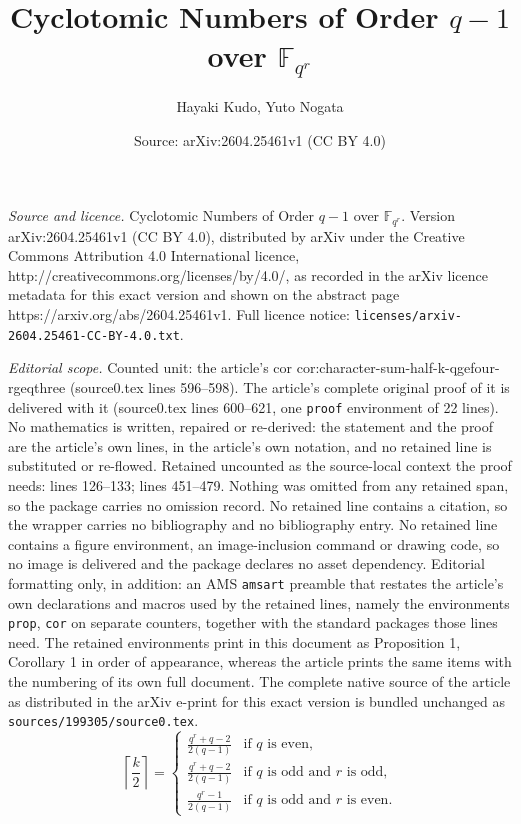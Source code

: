 \documentclass[10pt,a4paper]{amsart}
\title{Cyclotomic Numbers of Order $q-1$ over $\mathbb{F}_{q^r}$}
\author{Hayaki Kudo, Yuto Nogata}
\date{Source: arXiv:2604.25461v1 (CC BY 4.0)}
\begin{document}
\maketitle

\noindent\emph{Source and licence.} Cyclotomic Numbers of Order $q-1$ over $\mathbb{F}_{q^r}$. Version arXiv:2604.25461v1 (CC BY 4.0), distributed by arXiv under the Creative Commons Attribution 4.0 International licence, http://creativecommons.org/licenses/by/4.0/, as recorded in the arXiv licence metadata for this exact version and shown on the abstract page https://arxiv.org/abs/2604.25461v1. Full licence notice: \texttt{licenses/arxiv-2604.25461-CC-BY-4.0.txt}.\par\smallskip

\noindent\textit{Editorial scope.} Counted unit: the article's cor cor:character-sum-half-k-qgefour-rgeqthree (source0.tex lines 596--598). The article's complete original proof of it is delivered with it (source0.tex lines 600--621, one \texttt{proof} environment of 22 lines). No mathematics is written, repaired or re-derived: the statement and the proof are the article's own lines, in the article's own notation, and no retained line is substituted or re-flowed.  Retained uncounted as the source-local context the proof needs: lines 126--133; lines 451--479.  Nothing was omitted from any retained span, so the package carries no omission record.  No retained line contains a citation, so the wrapper carries no bibliography and no bibliography entry.  No retained line contains a figure environment, an image-inclusion command or drawing code, so no image is delivered and the package declares no asset dependency.  Editorial formatting only, in addition: an AMS \texttt{amsart} preamble that restates the article's own declarations and macros used by the retained lines, namely the environments \texttt{prop}, \texttt{cor} on separate counters, together with the standard packages those lines need.  The retained environments print in this document as Proposition 1, Corollary 1 in order of appearance, whereas the article prints the same items with the numbering of its own full document.  The complete native source of the article as distributed in the arXiv e-print for this exact version is bundled unchanged as \texttt{sources/199305/source0.tex}.
\begin{equation}\label{eq:ceil-half-k}
\left\lceil \frac{k}{2}\right\rceil=
\begin{cases}
\frac{q^r+q-2}{2(q-1)} & \text{if $q$ is even,} \\
\frac{q^r+q-2}{2(q-1)} & \text{if $q$ is odd and $r$ is odd,} \\
\frac{q^r-1}{2(q-1)} & \text{if $q$ is odd and $r$ is even.}
\end{cases}
\end{equation}
\end{document}

